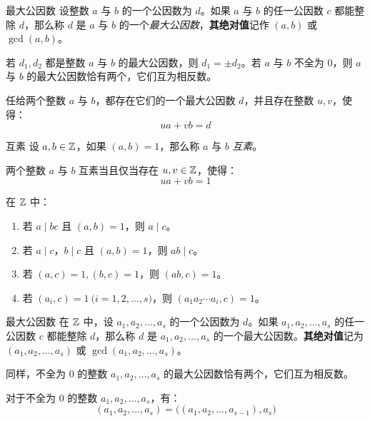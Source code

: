 \begin{definition}{最大公因数}
	设整数 $a$ 与 $b$ 的一个公因数为 $d$。如果 $a$ 与 $b$ 的任一公因数 $c$ 都能整除 $d$，那么称 $d$ 是 $a$ 与 $b$ 的一个\emph{最大公因数}，\textbf{其绝对值}记作 $(a, b)$ 或 $\gcd(a, b)$。
\end{definition}

若 $d_1, d_2$ 都是整数 $a$ 与 $b$ 的最大公因数，则 $d_1 = \pm d_2$。若 $a$ 与 $b$ 不全为 $0$，则 $a$ 与 $b$ 的最大公因数恰有两个，它们互为相反数。

\begin{proposition}
	任给两个整数 $a$ 与 $b$，都存在它们的一个最大公因数 $d$，并且存在整数 $u, v$，使得：
	$$
	ua + vb = d
	$$
\end{proposition}

\begin{definition}{互素}
	设 $a, b \in \mathbb Z$，如果 $(a, b) = 1$，那么称 $a$ 与 $b$ \emph{互素}。
\end{definition}

\begin{proposition}[互素的充分必要条件]
	两个整数 $a$ 与 $b$ 互素当且仅当存在 $u, v \in \mathbb Z$，使得：
	$$
	ua + vb = 1
	$$
\end{proposition}

\begin{proposition}
	在 $\mathbb Z$ 中：
	\begin{enumerate}
		\item 若 $a \mid bc$ 且 $(a, b) = 1$，则 $a \mid c$。
		\item 若 $a \mid c$，$b \mid c$ 且 $(a, b) = 1$，则 $ab \mid c$。
		\item 若 $(a, c) = 1, (b, c) = 1$，则 $(ab, c) = 1$。
		\item 若 $(a_i, c) = 1 \pod{i = 1, 2, \ldots, s}$，则 $(a_1 a_2 \cdots a_i, c) = 1$。
	\end{enumerate}
\end{proposition}

\begin{definition}{最大公因数}
	在 $\mathbb Z$ 中，设 $a_1, a_2, \ldots, a_s$ 的一个公因数为 $d$。如果 $a_1, a_2, \ldots, a_s$ 的任一公因数 $c$ 都能整除 $d$，那么称 $d$ 是 $a_1, a_2, \ldots, a_s$ 的一个最大公因数。\textbf{其绝对值}记为 $(a_1, a_2, \ldots, a_s)$ 或 $\gcd(a_1, a_2, \ldots, a_s)$。
\end{definition}

同样，不全为 $0$ 的整数 $a_1, a_2, \ldots, a_s$ 的最大公因数恰有两个，它们互为相反数。

\begin{proposition}
	对于不全为 $0$ 的整数 $a_1, a_2, \ldots, a_s$，有：
	$$
	(a_1, a_2, \ldots, a_s) = \bigl( (a_1, a_2, \ldots, a_{s - 1}), a_s \bigr)
	$$
\end{proposition}

